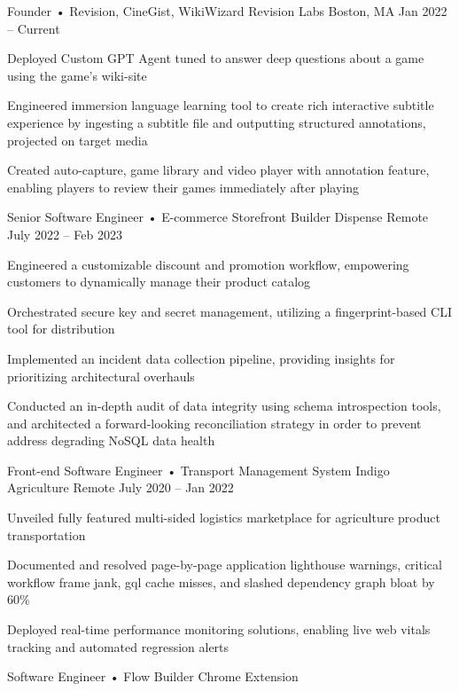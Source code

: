 \documentclass[]{awesome-cv}
\begin{document}
\begin{cventries}
	\cventry
	{Founder • Revision, CineGist, WikiWizard}
	{Revision Labs}
	{Boston, MA}
	{Jan 2022 – Current}
	{\begin{cvitems}
		\item {Deployed Custom GPT Agent tuned to answer deep questions about a game using the game's wiki-site}
		\item {Engineered immersion language learning tool to create rich interactive subtitle experience by ingesting a subtitle file and outputting structured annotations, projected on target media}
		\item {Created auto-capture, game library and video player with annotation feature, enabling players to review their games immediately after playing}
		\end{cvitems}}
	\cventry
	{Senior Software Engineer • E-commerce Storefront Builder}
	{Dispense}
	{Remote}
	{July 2022 – Feb 2023}
	{\begin{cvitems}
		\item {Engineered a customizable discount and promotion workflow, empowering customers to dynamically manage their product catalog}
		\item {Orchestrated secure key and secret management, utilizing a fingerprint-based CLI tool for distribution}
		\item {Implemented an incident data collection pipeline, providing insights for prioritizing architectural overhauls}
		\item {Conducted an in-depth audit of data integrity using schema introspection tools, and architected a forward-looking reconciliation strategy in order to prevent address degrading NoSQL data health}
		\end{cvitems}}
	\cventry
	{Front-end Software Engineer • Transport Management System}
	{Indigo Agriculture}
	{Remote}
	{July 2020 – Jan 2022}
	{\begin{cvitems}
		\item {Unveiled fully featured multi-sided logistics marketplace for agriculture product transportation}
		\item {Documented and resolved page-by-page application lighthouse warnings, critical workflow frame jank, gql cache misses, and slashed dependency graph bloat by 60\%}
		\item {Deployed real-time performance monitoring solutions, enabling live web vitals tracking and automated regression alerts}
		\end{cvitems}}
	\cventry
	{Software Engineer • Flow Builder Chrome Extension}

\end{cventries}
\end{document}
